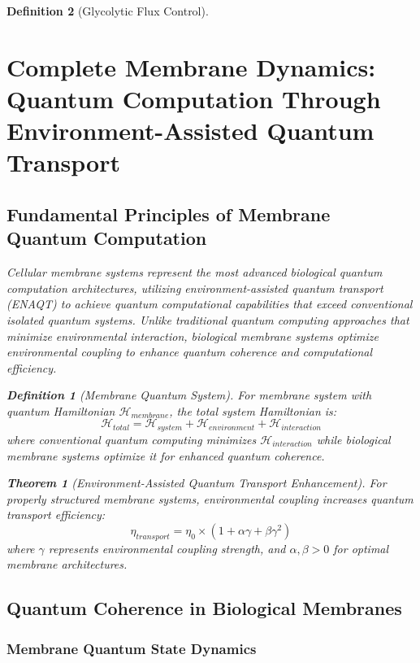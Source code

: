 \documentclass[12pt,a4paper]{article}
\newtheorem{theorem}{Theorem}
\newtheorem{definition}{Definition}
\begin{document}
\begin{definition}[Glycolytic Flux Control]
\section{Complete Membrane Dynamics: Quantum Computation Through Environment-Assisted Quantum Transport}

\subsection{Fundamental Principles of Membrane Quantum Computation}

Cellular membrane systems represent the most advanced biological quantum computation architectures, utilizing environment-assisted quantum transport (ENAQT) to achieve quantum computational capabilities that exceed conventional isolated quantum systems. Unlike traditional quantum computing approaches that minimize environmental interaction, biological membrane systems optimize environmental coupling to enhance quantum coherence and computational efficiency.

\begin{definition}[Membrane Quantum System]
For membrane system with quantum Hamiltonian $\mathcal{H}_{membrane}$, the total system Hamiltonian is:
\begin{equation}
\mathcal{H}_{total} = \mathcal{H}_{system} + \mathcal{H}_{environment} + \mathcal{H}_{interaction}
\end{equation}
where conventional quantum computing minimizes $\mathcal{H}_{interaction}$ while biological membrane systems optimize it for enhanced quantum coherence.
\end{definition}

\begin{theorem}[Environment-Assisted Quantum Transport Enhancement]
For properly structured membrane systems, environmental coupling increases quantum transport efficiency:
\begin{equation}
\eta_{transport} = \eta_0 \times (1 + \alpha \gamma + \beta \gamma^2)
\end{equation}
where $\gamma$ represents environmental coupling strength, and $\alpha, \beta > 0$ for optimal membrane architectures.
\end{theorem}

\subsection{Quantum Coherence in Biological Membranes}

\subsubsection{Membrane Quantum State Dynamics}


\end{definition}
\end{document}
